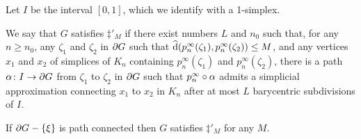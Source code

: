 \documentclass[a4paper]{article}
\begin{document}
\begin{definition}
  Let $I$ be the interval $[0,1]$, which we identify with a 1-simplex.  

  We say that $G$ satisfies $\ddag'_M$ if there exist numbers $L$ and $n_0$
  such that, for any $n \geq n_0$, any $\zeta_1$ and $\zeta_2$ in $\partial G$
  such that $\operatorname{\widehat{d}}(p^\infty_n(\zeta_1), p^\infty_n(\zeta_2)) \leq M$, and
  any vertices $x_1$ and $x_2$ of simplices of $K_n$ containing
  $p^\infty_n(\zeta_1)$ and $p^\infty_n(\zeta_2)$, there is a path $\alpha\colon
  I\to \partial G$ from $\zeta_1$ to $\zeta_2$ in $\partial G$ such that
  $p^\infty_n\circ\alpha$ admits a simplicial approximation connecting
  $x_1$ to $x_2$ in $K_n$ after at most $L$ barycentric subdivisions of $I$.
\end{definition}

\begin{proposition}\label{prop:sufficient_for_ddag_p}
  If $\partial G - \left\{\xi\right\}$ is path connected then $G$ satisfies $\ddag'_M$
  for any $M$.
\end{proposition}
\end{document}
